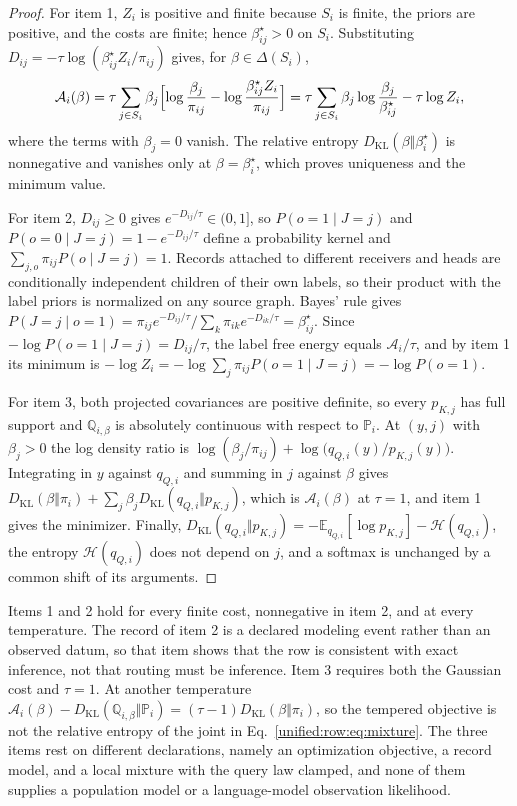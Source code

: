 \documentclass[11pt]{article}
\theoremstyle{definition}
\theoremstyle{remark}
\providecommand{\KL}{D_{\mathrm{KL}}}
\providecommand{\E}{\mathbb{E}}
\providecommand{\Hent}{\mathcal{H}}
\begin{document}
\begin{proof}
For item 1, $Z_i$ is positive and finite because $S_i$ is finite, the priors are positive, and the costs are finite; hence $\beta_{ij}^\star>0$ on $S_i$. Substituting $D_{ij}=-\tau\log(\beta_{ij}^\star Z_i/\pi_{ij})$ gives, for $\beta\in\Delta(S_i)$,
\[
\mathcal A_i(\beta)=\tau\sum_{j\in S_i}\beta_j\Bigl[\log\frac{\beta_j}{\pi_{ij}}-\log\frac{\beta_{ij}^\star Z_i}{\pi_{ij}}\Bigr]=\tau\sum_{j\in S_i}\beta_j\log\frac{\beta_j}{\beta_{ij}^\star}-\tau\log Z_i,
\]
where the terms with $\beta_j=0$ vanish. The relative entropy $\KL(\beta\Vert\beta_i^\star)$ is nonnegative and vanishes only at $\beta=\beta_i^\star$, which proves uniqueness and the minimum value.

For item 2, $D_{ij}\ge0$ gives $e^{-D_{ij}/\tau}\in(0,1]$, so $P(o=1\mid J=j)$ and $P(o=0\mid J=j)=1-e^{-D_{ij}/\tau}$ define a probability kernel and $\sum_{j,o}\pi_{ij}P(o\mid J=j)=1$. Records attached to different receivers and heads are conditionally independent children of their own labels, so their product with the label priors is normalized on any source graph. Bayes' rule gives $P(J=j\mid o=1)=\pi_{ij}e^{-D_{ij}/\tau}/\sum_k\pi_{ik}e^{-D_{ik}/\tau}=\beta_{ij}^\star$. Since $-\log P(o=1\mid J=j)=D_{ij}/\tau$, the label free energy equals $\mathcal A_i/\tau$, and by item 1 its minimum is $-\log Z_i=-\log\sum_j\pi_{ij}P(o=1\mid J=j)=-\log P(o=1)$.

For item 3, both projected covariances are positive definite, so every $p_{K,j}$ has full support and $\mathbb Q_{i,\beta}$ is absolutely continuous with respect to $\mathbb P_i$. At $(y,j)$ with $\beta_j>0$ the log density ratio is $\log(\beta_j/\pi_{ij})+\log\bigl(q_{Q,i}(y)/p_{K,j}(y)\bigr)$. Integrating in $y$ against $q_{Q,i}$ and summing in $j$ against $\beta$ gives $\KL(\beta\Vert\pi_i)+\sum_j\beta_j\KL(q_{Q,i}\Vert p_{K,j})$, which is $\mathcal A_i(\beta)$ at $\tau=1$, and item 1 gives the minimizer. Finally, $\KL(q_{Q,i}\Vert p_{K,j})=-\E_{q_{Q,i}}[\log p_{K,j}]-\Hent(q_{Q,i})$, the entropy $\Hent(q_{Q,i})$ does not depend on $j$, and a softmax is unchanged by a common shift of its arguments.
\end{proof}

Items 1 and 2 hold for every finite cost, nonnegative in item 2, and at every temperature. The record of item 2 is a declared modeling event rather than an observed datum, so that item shows that the row is consistent with exact inference, not that routing must be inference. Item 3 requires both the Gaussian cost and $\tau=1$. At another temperature $\mathcal A_i(\beta)-\KL(\mathbb Q_{i,\beta}\Vert\mathbb P_i)=(\tau-1)\KL(\beta\Vert\pi_i)$, so the tempered objective is not the relative entropy of the joint in Eq.~\eqref{unified:row:eq:mixture}. The three items rest on different declarations, namely an optimization objective, a record model, and a local mixture with the query law clamped, and none of them supplies a population model or a language-model observation likelihood.
\end{document}
